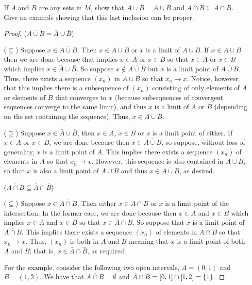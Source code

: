 \begin{exercise}{21}
If $A$ and $B$ are any sets in $M$, show that $\overline{A\cup B} =\bar{A}\cup\bar{B}$ and $\overline{A\cap B} \subseteq\bar{A}\cap\bar{B}$. 
Give an example showing that this last inclusion can be proper.
\end{exercise}
\begin{proof}
($\overline{A\cup B} =\bar{A}\cup\bar{B}$)

($\subseteq$) 
Suppose $x\in\overline{A\cup B}$. 
Then $x\in A\cup B$ or $x$ is a limit of $A\cup B$.
If $x\in A\cup B$ then we are done because that implies $x\in A$ or $x\in B$ so that $x\in\bar{A}$ or $x\in\bar{B}$ which implies $x\in\bar{A}\cup\bar{B}$.
So suppose $x\notin\overline{A\cup B}$ but $x$ is a limit point of $\overline{A\cup B}$.
Thus, there exists a sequence $(x_n)$ in $A\cup B$ so that $x_n\to x$.
Notice, however, that this implies there is a subsequence of $(x_n)$ consisting of only elements of $A$ or elements of $B$ that converges to $x$ (because subsequences of convergent sequences converge to the same limit), and thus $x$ is a limit of $A$ or $B$ (depending on the set containing the sequence). 
Thus, $x\in\bar{A}\cup\bar{B}$.

($\supseteq$) 
Suppose $x\in\bar{A}\cup\bar{B}$, then $x\in A$, $x\in B$ or $x$ is a limit point of either.
If $x\in A$ or $x\in B$, we are done because then $x\in\overline{A\cup B}$, so suppose, without loss of generality, $x$ is a limit point of $A$.
This implies there exists a sequence $(x_n)$ of elements in $A$ so that $x_n\to x$.
However, this sequence is also contained in $A\cup B$, so that $x$ is also a limit point of $A\cup B$ and thus $x\in\overline{A\cup B}$, as desired.

($\overline{A\cap B} \subseteq\bar{A}\cap\bar{B}$)

($\subseteq$)
Suppose $x\in\overline{A\cap B}$.
Then either $x\in A\cap B$ or $x$ is a limit point of the intersection.
In the former case, we are done because then $x\in A$ and $x\in B$ which implies $x\in\bar{A}$ and $x\in\bar{B}$ so that $x\in\bar{A}\cap\bar{B}$.
So suppose that $x$ is a limit point of $\overline{A\cap B}$.
This implies there exists a sequence $(x_n)$ of elements in $A\cap B$ so that $x_n\to x$.
Thus, $(x_n)$ is both in $A$ and $B$ meaning that $x$ is a limit point of both $A$ and $B$;
that is, $x\in\bar{A}\cap\bar{B}$, as required.

For the example, consider the following two open intervals, $A=(0,1)$ and $B=(1,2)$.
We have that $\overline{A\cap B}=\emptyset$ and $\bar{A}\cap\bar{B}=[0,1]\cap[1,2]=\{1\}$.
\end{proof}

